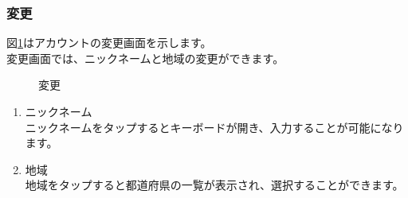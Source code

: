 \documentclass[a4j]{jarticle}
\begin{document}
\newpage
\subsubsection{変更}
図\ref{change}はアカウントの変更画面を示します。\\
変更画面では、ニックネームと地域の変更ができます。

\begin{figure}[H]
  \begin{center}
    \caption {変更}
    \label{change}
  \end{center}
\end{figure}

\begin{enumerate}
  \renewcommand{\labelenumi}{\textcircled{\scriptsize \theenumi}}
\item ニックネーム\\
  ニックネームをタップするとキーボードが開き、入力することが可能になります。
\item 地域\\
  地域をタップすると都道府県の一覧が表示され、選択することができます。
\end{enumerate}
\end{document}
